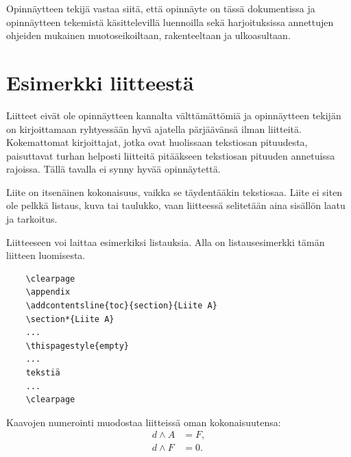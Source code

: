 \documentclass[english, 12pt, a4paper, sci, utf8, a-1b, online]{aaltothesis}
\begin{document}
Opinnäytteen tekijä vastaa siitä, että opinnäyte on tässä dokumentissa
ja opinnäytteen tekemistä käsittelevillä luennoilla sekä
harjoituksissa annettujen ohjeiden mukainen muotoseikoiltaan,
rakenteeltaan ja ulkoasultaan.



%
%





\clearpage
\thesisappendix

\section{Esimerkki liitteestä\label{LiiteA}}

Liitteet eivät ole opinnäytteen kannalta välttämättömiä ja 
opinnäytteen tekijän on 
kirjoittamaan ryhtyessään hyvä ajatella pärjäävänsä ilman liitteitä.
Kokemattomat kirjoittajat, jotka ovat huolissaan
tekstiosan pituudesta, paisuttavat turhan 
helposti liitteitä pitääkseen tekstiosan pituuden annetuissa rajoissa.
Tällä tavalla ei synny hyvää opinnäytettä.   

Liite on itsenäinen kokonaisuus, vaikka se täydentääkin tekstiosaa.
Liite ei siten ole pelkkä listaus, kuva tai taulukko, vaan 
liitteessä selitetään aina sisällön laatu ja tarkoitus. 

Liitteeseen voi laittaa esimerkiksi listauksia. Alla on 
listausesimerkki tämän liitteen luomisesta. 

\begin{verbatim}
	\clearpage
	\appendix
	\addcontentsline{toc}{section}{Liite A}
	\section*{Liite A}
	...
	\thispagestyle{empty}
	...
	tekstiä
	...
	\clearpage
\end{verbatim}

Kaavojen numerointi muodostaa liitteissä oman kokonaisuutensa:
\begin{align}
d \wedge A &= F, \label{liitekaava1}\\
d \wedge F &= 0. \label{liitekaava2}
\end{align}
\end{document}
